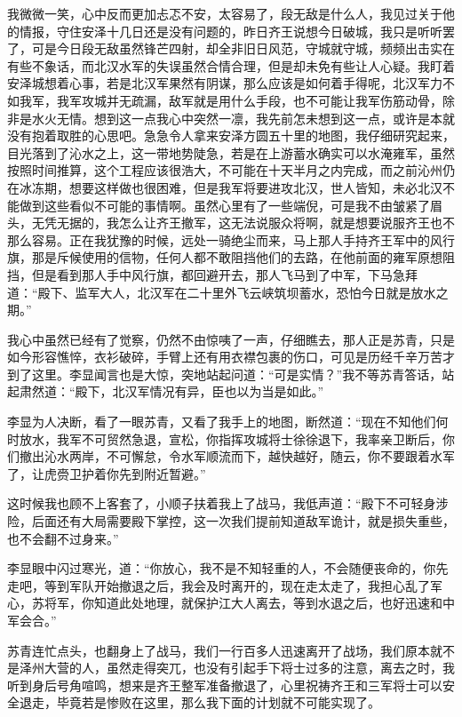 我微微一笑，心中反而更加忐忑不安，太容易了，段无敌是什么人，我见过关于他的情报，守住安泽十几日还是没有问题的，昨日齐王说想今日破城，我只是听听罢了，可是今日段无敌虽然锋芒四射，却全非旧日风范，守城就守城，频频出击实在有些不象话，而北汉水军的失误虽然合情合理，但是却未免有些让人心疑。我盯着安泽城想着心事，若是北汉军果然有阴谋，那么应该是如何着手得呢，北汉军力不如我军，我军攻城并无疏漏，敌军就是用什么手段，也不可能让我军伤筋动骨，除非是水火无情。想到这一点我心中突然一凛，我先前怎未想到这一点，或许是本就没有抱着取胜的心思吧。急急令人拿来安泽方圆五十里的地图，我仔细研究起来，目光落到了沁水之上，这一带地势陡急，若是在上游蓄水确实可以水淹雍军，虽然按照时间推算，这个工程应该很浩大，不可能在十天半月之内完成，而之前沁州仍在冰冻期，想要这样做也很困难，但是我军将要进攻北汉，世人皆知，未必北汉不能做到这些看似不可能的事情啊。虽然心里有了一些端倪，可是我不由皱紧了眉头，无凭无据的，我怎么让齐王撤军，这无法说服众将啊，就是想要说服齐王也不那么容易。正在我犹豫的时候，远处一骑绝尘而来，马上那人手持齐王军中的风行旗，那是斥候使用的信物，任何人都不敢阻挡他们的去路，在他前面的雍军原想阻挡，但是看到那人手中风行旗，都回避开去，那人飞马到了中军，下马急拜道：“殿下、监军大人，北汉军在二十里外飞云峡筑坝蓄水，恐怕今日就是放水之期。”

我心中虽然已经有了觉察，仍然不由惊咦了一声，仔细瞧去，那人正是苏青，只是如今形容憔悴，衣衫破碎，手臂上还有用衣襟包裹的伤口，可见是历经千辛万苦才到了这里。李显闻言也是大惊，突地站起问道：“可是实情？”我不等苏青答话，站起肃然道：“殿下，北汉军情况有异，臣也以为当是如此。”

李显为人决断，看了一眼苏青，又看了我手上的地图，断然道：“现在不知他们何时放水，我军不可贸然急退，宣松，你指挥攻城将士徐徐退下，我率亲卫断后，你们撤出沁水两岸，不可懈怠，令水军顺流而下，越快越好，随云，你不要跟着水军了，让虎赍卫护着你先到附近暂避。”

这时候我也顾不上客套了，小顺子扶着我上了战马，我低声道：“殿下不可轻身涉险，后面还有大局需要殿下掌控，这一次我们提前知道敌军诡计，就是损失重些，也不会翻不过身来。”

李显眼中闪过寒光，道：“你放心，我不是不知轻重的人，不会随便丧命的，你先走吧，等到军队开始撤退之后，我会及时离开的，现在走太走了，我担心乱了军心，苏将军，你知道此处地理，就保护江大人离去，等到水退之后，也好迅速和中军会合。”

苏青连忙点头，也翻身上了战马，我们一行百多人迅速离开了战场，我们原本就不是泽州大营的人，虽然走得突兀，也没有引起手下将士过多的注意，离去之时，我听到身后号角喧鸣，想来是齐王整军准备撤退了，心里祝祷齐王和三军将士可以安全退走，毕竟若是惨败在这里，那么我下面的计划就不可能实现了。

